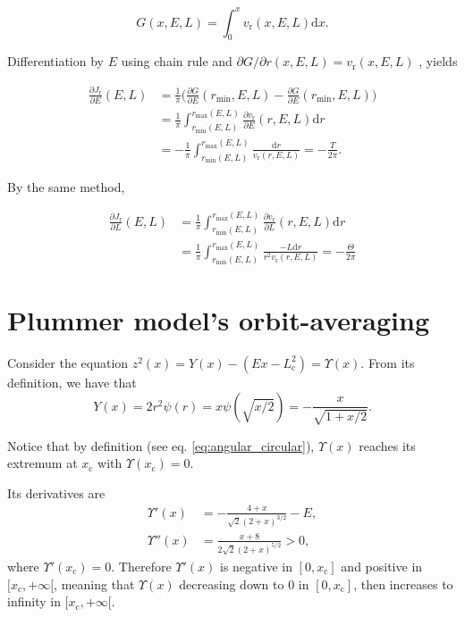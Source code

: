 \documentclass[11pt]{article}
\newcommand{\rr}{\mathrm{r}}
\newcommand{\rc}{\mathrm{c}}
\newcommand{\vr}{v_{\rr}}
\newcommand{\rd}{{\mathrm{d}}}
\newcommand{\rmax}{r_{\max}}
\newcommand{\rmin}{r_{\min}}
\newcommand{\Lc}{L_{{\mathrm{c}}}}
\newcommand{\Jr}{J_{\mathrm{r}}}
\newcommand{\xc}{x_{\rc}}
\begin{document}
\begin{appendices}
\begin{equation}
  G(x,E,L) = \int_{0}^{x} \vr(x,E,L) \rd x .
  \label{eq:Jr_eq_G}
\end{equation}

Differentiation by $E$ using chain rule and $\partial G/\partial r (x,E,L) = \vr(x,E,L)$ , yields

\begin{align*}
  \frac{\partial \Jr}{\partial E}(E,L) &= \frac{1}{\pi} \bigg( \frac{\partial G}{\partial E}(\rmin,E,L)- \frac{\partial G}{\partial E}(\rmin,E,L)\bigg)
  \label{eq:dJrdE} \\
  &= \frac{1}{\pi} \int_{\rmin(E,L)}^{\rmax(E,L)} \frac{\partial \vr}{\partial E} (r,E,L) \rd r \\
  &= - \frac{1}{\pi} \int_{\rmin(E,L)}^{\rmax(E,L)} \frac{\rd r}{\vr(r,E,L)} = -\frac{T}{2\pi} .
\end{align*}

By the same method,

\begin{align*}
  \frac{\partial \Jr}{\partial L}(E,L) &= \frac{1}{\pi} \int_{\rmin(E,L)}^{\rmax(E,L)} \frac{\partial \vr}{\partial L} (r,E,L) \rd r \\
  &= \frac{1}{\pi} \int_{\rmin(E,L)}^{\rmax(E,L)} \frac{- L \rd r }{r^{2} \vr(r,E,L)} = - \frac{\Theta}{2\pi}
\end{align*}

\section{Plummer model's orbit-averaging}
\label{sec:OrbAvrPlummer}

Consider the equation $z^{2}(x)=Y(x)-(Ex-\Lc^{2})=\Upsilon(x)$. From its definition, we have that
\begin{equation}
  Y(x) = 2r^{2}\psi(r) = x \psi(\sqrt{x/2}) = - \frac{x}{\sqrt{1+x/2}} .
  \label{eq:Y(x)_Plummer}
\end{equation}

Notice that by definition (see eq. \eqref{eq:angular_circular}), $\Upsilon(x)$ reaches its extremum at $\xc$ with $\Upsilon(\xc)=0$.

Its derivatives are
\begin{align*}
  \Upsilon'(x)&=-\frac{4+x}{\sqrt{2}(2+x)^{3/2}}-E,\\
  \Upsilon''(x)&= \frac{x+8}{2\sqrt{2}(2+x)^{5/2}}>0, 
\end{align*}
where $\Upsilon'(\xc)=0$. Therefore $\Upsilon'(x)$ is negative in $[0,\xc]$ and positive in $[\xc,+\infty[$, meaning that $\Upsilon(x)$ decreasing down to $0$ in $[0,\xc]$, then increases to infinity in $[\xc,+\infty[$.


\end{appendices}
\end{document}
